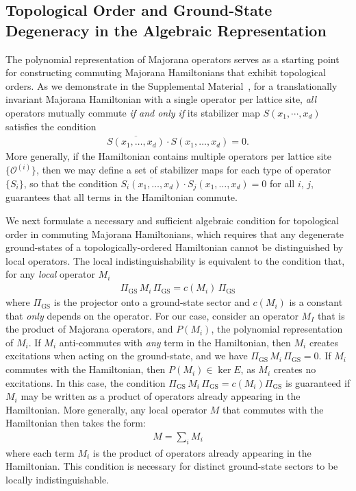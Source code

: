 \documentclass[aps,twocolumn,preprintnumbers,floatfix,showpacs,prx]{revtex4-1}
\begin{document}
\subsection{Topological Order and Ground-State Degeneracy in the Algebraic Representation}

The polynomial representation of Majorana operators 
serves as a starting point for constructing commuting Majorana Hamiltonians that exhibit topological orders.
As we demonstrate in the Supplemental Material~\cite{Supp_Mat},
for a translationally invariant Majorana Hamiltonian with a single operator per lattice site, 
{\it all} operators mutually commute \emph{if and only if} its stabilizer map $S(x_{1},\cdots,x_{d})$ satisfies the condition 
\begin{align}\label{eq:Commutativity}
\overline{S(x_1,\ldots,x_d)}\cdot S(x_{1},\ldots,x_{d}) = 0.
\end{align}
More generally, if the Hamiltonian contains multiple operators per lattice site $\{\mathcal{O}^{(i)}\}$,
then we may define a set of stabilizer maps for each type of operator $\{S_{i}\}$,
so that the condition $\overline{S_{i}(x_{1},\ldots,x_{d})}\cdot S_{j}(x_{1},\ldots,x_{d}) = 0$ for all $i$, $j$,
guarantees that all terms in the Hamiltonian commute.

We next formulate a necessary and sufficient algebraic condition for topological order in commuting Majorana Hamiltonians,
which requires that any degenerate ground-states of a topologically-ordered Hamiltonian 
cannot be distinguished by local operators.
The local indistinguishability is equivalent to the condition that,
for {any} \emph{local} operator $M_{i}$
\begin{align}\label{eq:Local_Indist}
\Pi_{\mathrm{GS}}\,M_{i}\,\Pi_{\mathrm{GS}} = c(M_{i})\,\Pi_{\mathrm{GS}}
\end{align}
where $\Pi_{\mathrm{GS}}$ is the projector onto a ground-state sector
and $c(M_{i})$ is a constant that \emph{only} depends on the operator.
For our case, consider an operator $M_{I}$ that is the product of Majorana operators,
and $P(M_{i})$, the polynomial representation of $M_{i}$.
If $M_{i}$ anti-commutes with \emph{any} term in the Hamiltonian,
then $M_{i}$ creates excitations when acting on the ground-state,
and we have $\Pi_{\mathrm{GS}}\,M_{i}\,\Pi_{\mathrm{GS}} = 0$.
If $M_{i}$ commutes with the Hamiltonian,
then $P(M_{i}) \in \ker E$, as $M_{i}$ creates no excitations.
In this case, the condition $\Pi_{\mathrm{GS}}\,M_{i}\,\Pi_{\mathrm{GS}} = c(M_{i})\Pi_{\mathrm{GS}}$
is guaranteed if $M_{i}$ may be written as a product of operators already appearing in the Hamiltonian.
More generally, any local operator $M$ that commutes with the Hamiltonian then takes the form:
\begin{align}
M = \sum_{i}M_{i}
\end{align}
where each term $M_{i}$ is the product of operators already appearing in the Hamiltonian.
This condition is necessary for distinct ground-state sectors to be locally indistinguishable.
\end{document}
